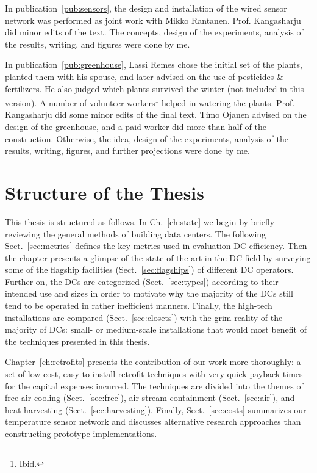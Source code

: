 \documentclass[officiallayout]{tktla}
\begin{document}
In publication~\ref{pub:sensors}, the design and installation of the wired
sensor network was performed as joint work with Mikko Rantanen. Prof.
Kangasharju did minor edits of the text. The concepts, design of the
experiments, analysis of the results, writing, and figures were done by me.

In publication~\ref{pub:greenhouse}, Lassi Remes chose the initial set of the
plants, planted them with his spouse, and later advised on the use of
pesticides \& fertilizers. He also judged which plants survived the winter
(not included in this version). A number of volunteer workers\footnote{Ibid.}
helped in watering the plants. Prof. Kangasharju did some minor edits of the
final text. Timo Ojanen advised on the design of the greenhouse, and a paid
worker did more than half of the construction. Otherwise, the idea, design of
the experiments, analysis of the results, writing, figures, and further
projections were done by me. 



\section{Structure of the Thesis}

This thesis is structured as follows. In Ch.~\ref{ch:state} we begin by
briefly reviewing the general methods of building data centers. The following
Sect.~\ref{sec:metrics} defines the key metrics used in evaluation DC
efficiency. Then the chapter presents a glimpse of the state of the art in the
DC field by surveying some of the flagship facilities
(Sect.~\ref{sec:flagships}) of different DC operators. Further on, the DCs are
categorized (Sect.~\ref{sec:types}) according to their intended use and sizes
in order to motivate why the majority of the DCs still tend to be operated in
rather inefficient manners. Finally, the high-tech installations are compared
(Sect.~\ref{sec:closets}) with the grim reality of the majority of DCs: small-
or medium-scale installations that would most benefit of the techniques
presented in this thesis.

Chapter~\ref{ch:retrofits} presents the contribution of our work more
thoroughly: a set of low-cost, easy-to-install retrofit techniques with very
quick payback times for the capital expenses incurred. The techniques are
divided into the themes of free air cooling (Sect.~\ref{sec:free}), air stream
containment (Sect.~\ref{sec:air}), and heat harvesting
(Sect.~\ref{sec:harvesting}).  Finally, Sect.~\ref{sec:costs} summarizes our
temperature sensor network and discusses alternative research approaches than
constructing prototype implementations.
\end{document}
